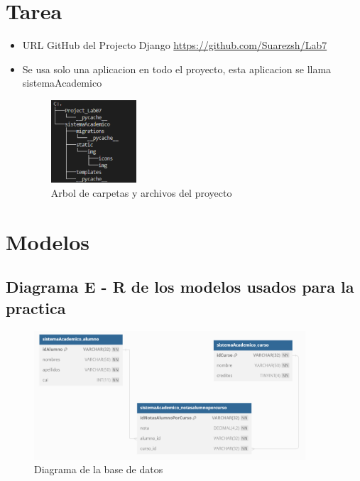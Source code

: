 \documentclass{article}
\begin{document}
	\section{Tarea}
	
\begin{itemize}
    \item URL GitHub del Projecto Django \url{https://github.com/Suarezsh/Lab7}   
    \item Se usa solo una aplicacion en todo el proyecto, esta aplicacion se llama sistemaAcademico
                \begin{figure}[h]
                \centering
                \includegraphics[width=0.3\textwidth]{img/tree.png}
                \caption{Arbol de carpetas y archivos del proyecto}
                \label{fig:modelo_bd}
            \end{figure}
            
\end{itemize}


	\section{Modelos}
	
	\subsection{Diagrama E - R de los modelos usados para la practica}
                \begin{figure}[h]
                \centering
                \includegraphics[width=0.9\textwidth]{img/models.png}
                \caption{Diagrama de la base de datos}
                \label{fig:modelo_bd}
            \end{figure}
\end{document}
